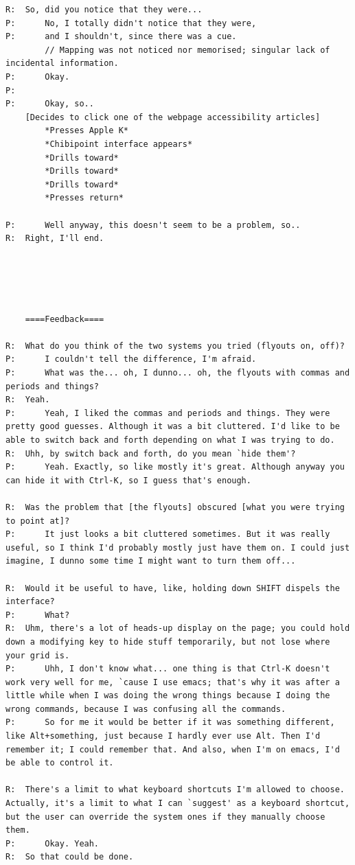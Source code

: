 \documentclass[a4paper, 12pt]{report}
\begin{document}
\begin{lstlisting}[caption={Transcript of Usability Study}, label={lst:usabilityTrans}, style=basic, language=custom, flexiblecolumns=true]
R:	So, did you notice that they were...
P:		No, I totally didn't notice that they were,
P:		and I shouldn't, since there was a cue.
		// Mapping was not noticed nor memorised; singular lack of incidental information.
P:		Okay.
P:		
P:		Okay, so..
	[Decides to click one of the webpage accessibility articles]
		*Presses Apple K*
		*Chibipoint interface appears*
		*Drills toward*
		*Drills toward*
		*Drills toward*
		*Presses return*

P:		Well anyway, this doesn't seem to be a problem, so..
R:	Right, I'll end.





	====Feedback====

R:	What do you think of the two systems you tried (flyouts on, off)?
P:		I couldn't tell the difference, I'm afraid.
P:		What was the... oh, I dunno... oh, the flyouts with commas and periods and things?
R:	Yeah.
P:		Yeah, I liked the commas and periods and things. They were pretty good guesses. Although it was a bit cluttered. I'd like to be able to switch back and forth depending on what I was trying to do.
R:	Uhh, by switch back and forth, do you mean `hide them'?
P:		Yeah. Exactly, so like mostly it's great. Although anyway you can hide it with Ctrl-K, so I guess that's enough.

R:	Was the problem that [the flyouts] obscured [what you were trying to point at]?
P:		It just looks a bit cluttered sometimes. But it was really useful, so I think I'd probably mostly just have them on. I could just imagine, I dunno some time I might want to turn them off...

R:	Would it be useful to have, like, holding down SHIFT dispels the interface?
P:		What?
R:	Uhm, there's a lot of heads-up display on the page; you could hold down a modifying key to hide stuff temporarily, but not lose where your grid is.
P:		Uhh, I don't know what... one thing is that Ctrl-K doesn't work very well for me, `cause I use emacs; that's why it was after a little while when I was doing the wrong things because I doing the wrong commands, because I was confusing all the commands.
P:		So for me it would be better if it was something different, like Alt+something, just because I hardly ever use Alt. Then I'd remember it; I could remember that. And also, when I'm on emacs, I'd be able to control it.

R:	There's a limit to what keyboard shortcuts I'm allowed to choose. Actually, it's a limit to what I can `suggest' as a keyboard shortcut, but the user can override the system ones if they manually choose them.
P:		Okay. Yeah.
R:	So that could be done.


\end{lstlisting}
\end{document}
